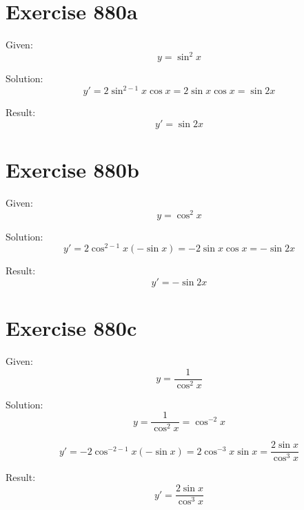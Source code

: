 \documentclass[a4paper, 10pt]{scrartcl}
\begin{document}
\section{Exercise 880a}

Given:
\[
y = \sin^{2}{x}
\]

Solution:
\[
y' = 2\sin^{2 - 1}{x}\cos{x} = 2\sin{x}\cos{x} = \sin{2x}
\]

Result:
\[
y' = \sin{2x}
\]

\section{Exercise 880b}

Given:
\[
y = \cos^{2}{x}
\]

Solution:
\[
y' = 2\cos^{2 - 1}{x}(-\sin{x}) = -2\sin{x}\cos{x} = -\sin{2x}
\]

Result:
\[
y' = -\sin{2x}
\]

\section{Exercise 880c}

Given:
\[
y = \frac{1}{\cos^{2}{x}}
\]

Solution:
\[
y = \frac{1}{\cos^{2}{x}} = \cos^{-2}{x}
\]

\[
y' = -2\cos^{-2 - 1}{x}(-\sin{x}) = 2\cos^{-3}{x}\sin{x} = \frac{2\sin{x}}{\cos^{3}{x}}
\]

Result:
\[
y' = \frac{2\sin{x}}{\cos^{3}{x}}
\]
\end{document}

